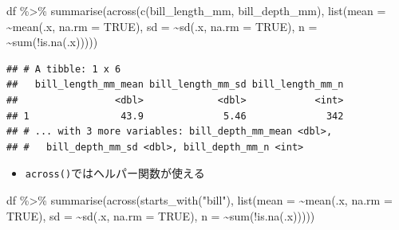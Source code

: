 \documentclass[
  xelatex,ja=standard, b5paper]{bxjsbook}
\newenvironment{Shaded}{\begin{snugshade}}{\end{snugshade}}
\newcommand{\AttributeTok}[1]{\textcolor[rgb]{0.77,0.63,0.00}{#1}}
\newcommand{\ConstantTok}[1]{\textcolor[rgb]{0.00,0.00,0.00}{#1}}
\newcommand{\FunctionTok}[1]{\textcolor[rgb]{0.00,0.00,0.00}{#1}}
\newcommand{\NormalTok}[1]{#1}
\newcommand{\SpecialCharTok}[1]{\textcolor[rgb]{0.00,0.00,0.00}{#1}}
\newcommand{\StringTok}[1]{\textcolor[rgb]{0.31,0.60,0.02}{#1}}
\providecommand{\tightlist}{%
  \setlength{\itemsep}{0pt}\setlength{\parskip}{0pt}}
\begin{document}
\begin{Shaded}
\begin{Highlighting}[]
\NormalTok{df }\SpecialCharTok{\%\textgreater{}\%} 
  \FunctionTok{summarise}\NormalTok{(}\FunctionTok{across}\NormalTok{(}\FunctionTok{c}\NormalTok{(bill\_length\_mm, bill\_depth\_mm),}
                   \FunctionTok{list}\NormalTok{(}\AttributeTok{mean =} \SpecialCharTok{\textasciitilde{}}\FunctionTok{mean}\NormalTok{(.x, }\AttributeTok{na.rm =} \ConstantTok{TRUE}\NormalTok{),}
                        \AttributeTok{sd =} \SpecialCharTok{\textasciitilde{}}\FunctionTok{sd}\NormalTok{(.x, }\AttributeTok{na.rm =} \ConstantTok{TRUE}\NormalTok{),}
                        \AttributeTok{n =} \SpecialCharTok{\textasciitilde{}}\FunctionTok{sum}\NormalTok{(}\SpecialCharTok{!}\FunctionTok{is.na}\NormalTok{(.x)))))}
\end{Highlighting}
\end{Shaded}

\begin{verbatim}
## # A tibble: 1 x 6
##   bill_length_mm_mean bill_length_mm_sd bill_length_mm_n
##                 <dbl>             <dbl>            <int>
## 1                43.9              5.46              342
## # ... with 3 more variables: bill_depth_mm_mean <dbl>,
## #   bill_depth_mm_sd <dbl>, bill_depth_mm_n <int>
\end{verbatim}

\begin{itemize}
\tightlist
\item
  \texttt{across()}ではヘルパー関数が使える
\end{itemize}

\begin{Shaded}
\begin{Highlighting}[]
\NormalTok{df }\SpecialCharTok{\%\textgreater{}\%} 
  \FunctionTok{summarise}\NormalTok{(}\FunctionTok{across}\NormalTok{(}\FunctionTok{starts\_with}\NormalTok{(}\StringTok{"bill"}\NormalTok{),}
                   \FunctionTok{list}\NormalTok{(}\AttributeTok{mean =} \SpecialCharTok{\textasciitilde{}}\FunctionTok{mean}\NormalTok{(.x, }\AttributeTok{na.rm =} \ConstantTok{TRUE}\NormalTok{),}
                        \AttributeTok{sd =} \SpecialCharTok{\textasciitilde{}}\FunctionTok{sd}\NormalTok{(.x, }\AttributeTok{na.rm =} \ConstantTok{TRUE}\NormalTok{),}
                        \AttributeTok{n =} \SpecialCharTok{\textasciitilde{}}\FunctionTok{sum}\NormalTok{(}\SpecialCharTok{!}\FunctionTok{is.na}\NormalTok{(.x)))))}
\end{Highlighting}
\end{Shaded}
\end{document}
